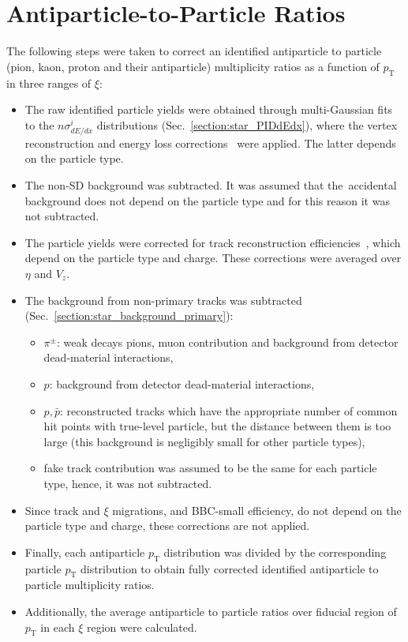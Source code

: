 \section{Antiparticle-to-Particle Ratios}\label{section:star_ratios}
The following steps were taken to correct an  identified antiparticle to particle (pion, kaon, proton and their antiparticle) multiplicity ratios as a function of $p_\textrm{T}$ in three ranges of $\xi$:
\begin{itemize}
	\item The raw identified particle yields were obtained through multi-Gaussian fits to the $n\sigma^i_{dE/dx}$ distributions (Sec.~\ref{section:star_PIDdEdx}), where the vertex reconstruction and energy loss corrections~\cite{supplementaryNote} were applied. The latter depends on the particle type.
	\item The non-SD background was subtracted. It was assumed that the~accidental background does not depend on the particle type and for this reason it was not subtracted.
	\item The particle yields were corrected for track reconstruction efficiencies~\cite{supplementaryNote}, which depend on the particle type and charge. These corrections were averaged over $\eta$ and $V_{z}$.
	\item The background from non-primary tracks was subtracted (Sec.~\ref{section:star_background_primary}):
	\begin{itemize}
		\item $\pi^\pm$: weak decays pions, muon contribution and background from  detector dead-material interactions,
		\item $p$: background from  detector dead-material interactions,
		\item $p,\bar{p}$: reconstructed tracks which have the appropriate number of common hit points with true-level particle, but the distance between them is too large (this background is negligibly small for other particle types),
		\item fake track contribution was assumed to be the same for each particle type, hence, it was not subtracted. 
	\end{itemize}
	\item Since  track and $\xi$ migrations, and BBC-small efficiency, do not depend on the particle type and charge, these corrections are not applied.
	\item Finally, each antiparticle $p_\textrm{T}$ distribution was divided by the corresponding particle $p_\textrm{T}$ distribution to obtain fully corrected identified antiparticle to particle multiplicity ratios.
	\item Additionally, the average antiparticle to particle ratios over fiducial
	region of $p_\textrm{T}$ in each $\xi$ region were calculated.
	
\end{itemize}